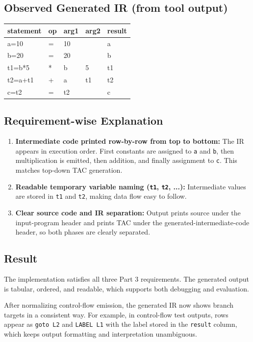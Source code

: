 \documentclass[a4paper,12pt]{article}
\begin{document}
\subsection{Observed Generated IR (from tool output)}
\begin{center}
\small
\ttfamily
\begin{tabular}{|l|l|l|l|l|}
\hline
statement & op & arg1 & arg2 & result \\
\hline
a=10 & = & 10 &  & a \\
b=20 & = & 20 &  & b \\
t1=b*5 & * & b & 5 & t1 \\
t2=a+t1 & + & a & t1 & t2 \\
c=t2 & = & t2 &  & c \\
\hline
\end{tabular}
\end{center}

\subsection{Requirement-wise Explanation}
\begin{enumerate}
    \item \textbf{Intermediate code printed row-by-row from top to bottom:} The IR appears in execution order. First constants are assigned to \texttt{a} and \texttt{b}, then multiplication is emitted, then addition, and finally assignment to \texttt{c}. This matches top-down TAC generation.
    \item \textbf{Readable temporary variable naming (\texttt{t1}, \texttt{t2}, ...):} Intermediate values are stored in \texttt{t1} and \texttt{t2}, making data flow easy to follow.
    \item \textbf{Clear source code and IR separation:} Output prints source under the input-program header and prints TAC under the generated-intermediate-code header, so both phases are clearly separated.
\end{enumerate}

\subsection{Result}
The implementation satisfies all three Part 3 requirements. The generated output is tabular, ordered, and readable, which supports both debugging and evaluation.

After normalizing control-flow emission, the generated IR now shows branch targets in a consistent way. For example, in control-flow test outputs, rows appear as \texttt{goto L2} and \texttt{LABEL L1} with the label stored in the \texttt{result} column, which keeps output formatting and interpretation unambiguous.
\end{document}
